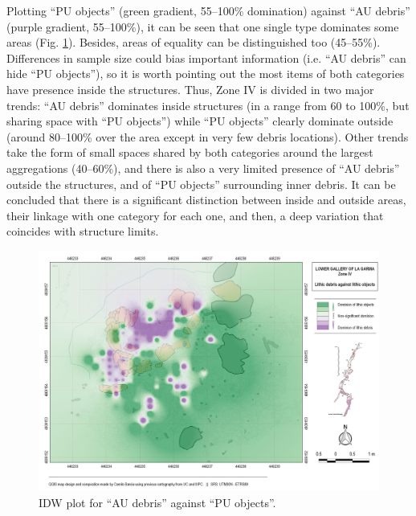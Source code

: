 Plotting “PU objects” (green gradient, 55–100\% domination) against “AU debris” (purple gradient, 55–100\%), it can be seen that one single type dominates some areas (Fig. \ref{fig:Garcia_Fig7}). Besides, areas of equality can be distinguished too (45–55\%). Differences in sample size could bias important information (i.e. “AU debris” can hide “PU objects”), so it is worth pointing out the most items of both categories have presence inside the structures. Thus, Zone IV is divided in two major trends: “AU debris” dominates inside structures (in a range from 60 to 100\%, but sharing space with “PU objects”) while “PU objects” clearly dominate outside (around 80–100\% over the area except in very few debris locations). Other trends take the form of small spaces shared by both categories around the largest aggregations (40–60\%), and there is also a very limited presence of “AU debris” outside the structures, and of “PU objects” surrounding inner debris. It can be concluded that there is a significant distinction between inside and outside areas, their linkage with one category for each one, and then, a deep variation that coincides with structure limits.
 
\begin{figure}
	\includegraphics[width=\linewidth]{figures/garcia_Fig7}
	\centering
	\caption{IDW plot for “AU debris” against “PU objects”.}
	\label{fig:Garcia_Fig7}
\end{figure}


